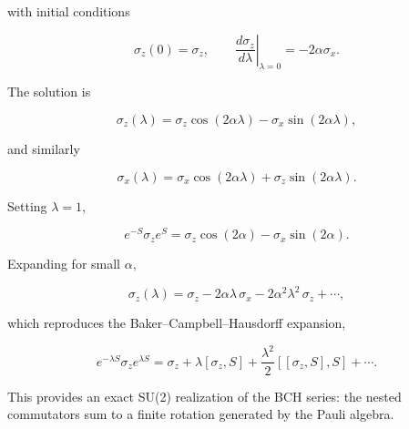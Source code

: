 \documentclass[11pt]{article}
\begin{document}
with initial conditions

\[
\sigma_z(0)=\sigma_z,
\qquad
\left.\frac{d\sigma_z}{d\lambda}\right|_{\lambda=0}
=
-2\alpha\sigma_x.
\]

The solution is

\[
\sigma_z(\lambda)
=
\sigma_z\cos(2\alpha\lambda)
-
\sigma_x\sin(2\alpha\lambda),
\]

and similarly

\[
\sigma_x(\lambda)
=
\sigma_x\cos(2\alpha\lambda)
+
\sigma_z\sin(2\alpha\lambda).
\]

Setting $\lambda=1$,

\[
e^{-S}\sigma_z e^S
=
\sigma_z\cos(2\alpha)
-
\sigma_x\sin(2\alpha).
\]

Expanding for small $\alpha$,

\[
\sigma_z(\lambda)
=
\sigma_z
-
2\alpha\lambda\,\sigma_x
-
2\alpha^2\lambda^2\,\sigma_z
+\cdots,
\]

which reproduces the Baker--Campbell--Hausdorff expansion,

\[
e^{-\lambda S}\sigma_z e^{\lambda S}
=
\sigma_z
+
\lambda[\sigma_z,S]
+
\frac{\lambda^2}{2}
[[\sigma_z,S],S]
+\cdots.
\]

This provides an exact SU(2) realization of the BCH series: the nested
commutators sum to a finite rotation generated by the Pauli algebra.
\end{document}
